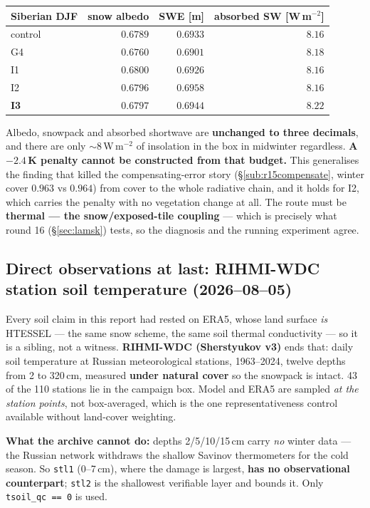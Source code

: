 \documentclass[10pt]{article}
\begin{document}
\begin{center}\footnotesize
\begin{tabular}{l r r r}
\toprule
Siberian DJF & snow albedo & SWE [m] & absorbed SW [W\,m$^{-2}$] \\
\midrule
control & $0.6789$ & $0.6933$ & $8.16$ \\
G4 & $0.6760$ & $0.6901$ & $8.18$ \\
I1 & $0.6800$ & $0.6926$ & $8.16$ \\
I2 & $0.6796$ & $0.6958$ & $8.16$ \\
\textbf{I3} & $0.6797$ & $0.6944$ & $8.22$ \\
\bottomrule
\end{tabular}
\end{center}

\noindent Albedo, snowpack and absorbed shortwave are \textbf{unchanged to three decimals},
and there are only ${\sim}8$\,W\,m$^{-2}$ of insolation in the box in midwinter regardless.
\textbf{A $-2.4$\,K penalty cannot be constructed from that budget.} This generalises the
finding that killed the compensating-error story (\S\ref{sub:r15compensate}, winter cover
$0.963$ vs $0.964$) from cover to the whole radiative chain, and it holds for I2, which
carries the penalty with no vegetation change at all. The route must be
\textbf{thermal --- the snow/exposed-tile coupling} --- which is precisely what round 16
(\S\ref{sec:lamsk}) tests, so the diagnosis and the running experiment agree.

\subsection{Direct observations at last: RIHMI-WDC station soil temperature (2026--08--05)}\label{sub:rihmi}
Every soil claim in this report had rested on ERA5, whose land surface \emph{is} HTESSEL ---
the same snow scheme, the same soil thermal conductivity --- so it is a sibling, not a
witness. \textbf{RIHMI-WDC (Sherstyukov v3)} ends that: daily soil temperature at Russian
meteorological stations, 1963--2024, twelve depths from 2 to 320\,cm, measured
\textbf{under natural cover} so the snowpack is intact. 43 of the 110 stations lie in the
campaign box. Model and ERA5 are sampled \emph{at the station points}, not box-averaged, which
is the one representativeness control available without land-cover weighting.

\textbf{What the archive cannot do:} depths 2/5/10/15\,cm carry \emph{no} winter data --- the
Russian network withdraws the shallow Savinov thermometers for the cold season. So
\texttt{stl1} (0--7\,cm), where the damage is largest, \textbf{has no observational
counterpart}; \texttt{stl2} is the shallowest verifiable layer and bounds it. Only
\texttt{tsoil\_qc == 0} is used.
\end{document}

